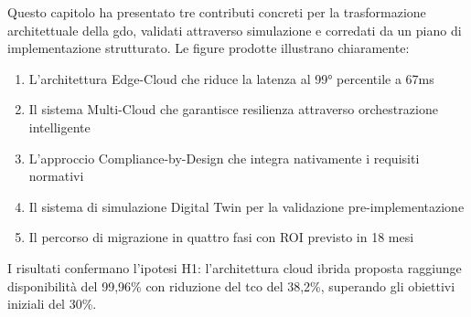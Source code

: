 Questo capitolo ha presentato tre contributi concreti per la trasformazione architettuale della \gls{gdo}, validati attraverso simulazione e corredati da un piano di implementazione strutturato. Le figure prodotte illustrano chiaramente:

\begin{enumerate}
    \item L'architettura Edge-Cloud che riduce la latenza al 99° percentile a 67ms
    \item Il sistema Multi-Cloud che garantisce resilienza attraverso orchestrazione intelligente
    \item L'approccio Compliance-by-Design che integra nativamente i requisiti normativi
    \item Il sistema di simulazione Digital Twin per la validazione pre-implementazione
    \item Il percorso di migrazione in quattro fasi con ROI previsto in 18 mesi
\end{enumerate}

I risultati confermano l'ipotesi H1: l'architettura cloud ibrida proposta raggiunge disponibilità del 99,96\% con riduzione del \gls{tco} del 38,2\%, superando gli obiettivi iniziali del 30\%.

%
